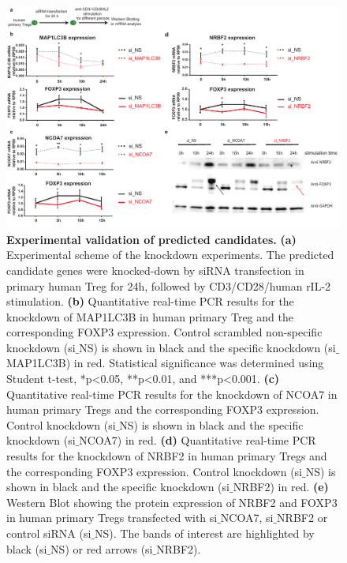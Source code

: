 \documentclass[oneside, 10pt, a4paper, twocolumn]{article}
\begin{document}
\begin{figure}
\centering
  \includegraphics[scale=0.57]{Fig2_Exp.pdf}
  \caption{\textbf{Experimental validation of predicted candidates.} 
\textbf{(a)} Experimental scheme of the knockdown experiments. The predicted candidate genes were knocked-down by siRNA transfection in primary human Treg for 24h, followed by CD3/CD28/human rIL-2 stimulation. 
\textbf{(b)} Quantitative real-time PCR results for the knockdown of MAP1LC3B in human primary Treg and the corresponding FOXP3 expression. Control scrambled non-specific knockdown (si$\_$NS) is shown in black and the specific knockdown (si$\_$MAP1LC3B) in red. Statistical significance was determined using Student t-test, *p<0.05, **p<0.01, and ***p<0.001.
\textbf{(c)} Quantitative real-time PCR results for the knockdown of NCOA7 in human primary Tregs and the corresponding FOXP3 expression. Control knockdown (si$\_$NS) is shown in black and the specific knockdown (si$\_$NCOA7) in red.
\textbf{(d)} Quantitative real-time PCR results for the knockdown of NRBF2 in human primary Tregs and the corresponding FOXP3 expression. Control knockdown (si$\_$NS) is shown in black and the specific knockdown (si$\_$NRBF2) in red.
\textbf{(e)} Western Blot showing the protein expression of NRBF2 and FOXP3 in human primary Tregs transfected with si$\_$NCOA7, si$\_$NRBF2 or control siRNA (si$\_$NS). The bands of interest are highlighted by black (si$\_$NS) or red arrows (si$\_${NRBF2}).
}  \label{fig:ExperimentalFindings}	
\end{figure}
\end{document}
